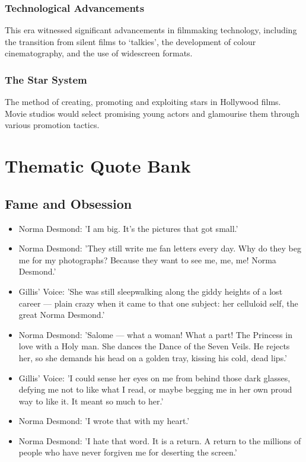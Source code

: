 \documentclass[a4paper]{article}
\begin{document}
\subsubsection{Technological Advancements}
This era witnessed significant advancements in filmmaking technology, including the transition from silent films to ‘talkies’, the development of colour cinematography, and the use of widescreen formats.\\

\subsubsection{The Star System}
The method of creating, promoting and exploiting stars in Hollywood films. Movie studios would select promising young actors and glamourise them through various promotion tactics.\\






\newpage
\section{Thematic Quote Bank}

\subsection{Fame and Obsession}
\begin{itemize}
  \item Norma Desmond: 'I am big. It's the pictures that got small.'
  \item Norma Desmond: 'They still write me fan letters every day. Why do they beg me for my photographs? Because they want to see me, me, me! Norma Desmond.'
  \item Gillis' Voice: 'She was still sleepwalking along the giddy heights of a lost career — plain crazy when it came to that one subject: her celluloid self, the great Norma Desmond.'
  \item Norma Desmond: 'Salome — what a woman! What a part! The Princess in love with a Holy man. She dances the Dance of the Seven Veils. He rejects her, so she demands his head on a golden tray, kissing his cold, dead lips.'
  \item Gillis' Voice: 'I could sense her eyes on me from behind those dark glasses, defying me not to like what I read, or maybe begging me in her own proud way to like it. It meant so much to her.'
  \item Norma Desmond: 'I wrote that with my heart.'
  \item Norma Desmond: 'I hate that word. It is a return. A return to the millions of people who have never forgiven me for deserting the screen.'\\
\end{itemize}
\end{document}
